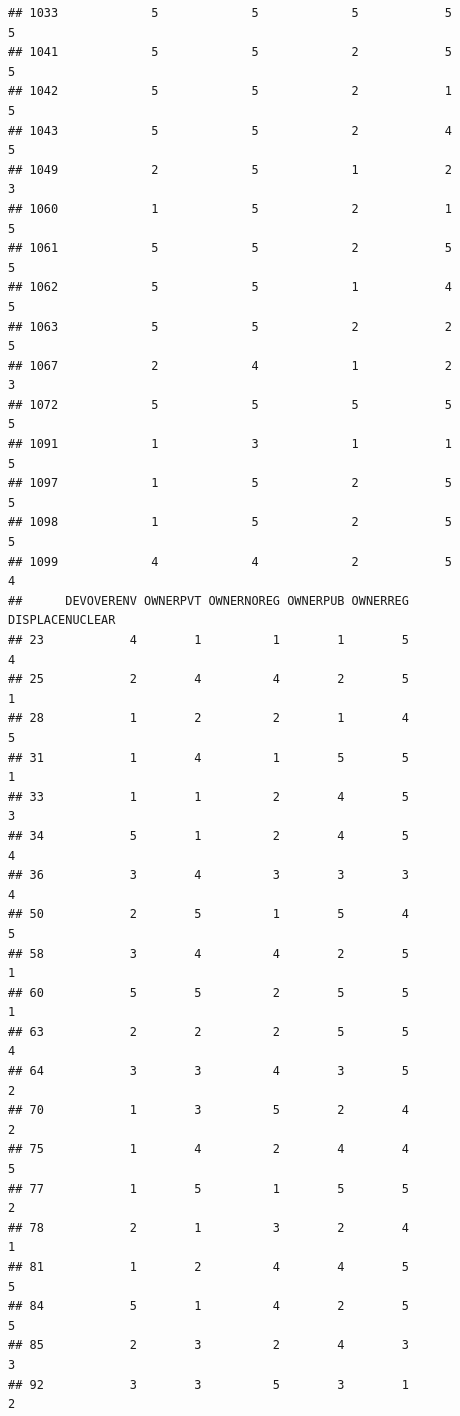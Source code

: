\documentclass[
]{article}
\begin{document}
\begin{verbatim}
## 1033             5             5             5            5          5
## 1041             5             5             2            5          5
## 1042             5             5             2            1          5
## 1043             5             5             2            4          5
## 1049             2             5             1            2          3
## 1060             1             5             2            1          5
## 1061             5             5             2            5          5
## 1062             5             5             1            4          5
## 1063             5             5             2            2          5
## 1067             2             4             1            2          3
## 1072             5             5             5            5          5
## 1091             1             3             1            1          5
## 1097             1             5             2            5          5
## 1098             1             5             2            5          5
## 1099             4             4             2            5          4
##      DEVOVERENV OWNERPVT OWNERNOREG OWNERPUB OWNERREG DISPLACENUCLEAR
## 23            4        1          1        1        5               4
## 25            2        4          4        2        5               1
## 28            1        2          2        1        4               5
## 31            1        4          1        5        5               1
## 33            1        1          2        4        5               3
## 34            5        1          2        4        5               4
## 36            3        4          3        3        3               4
## 50            2        5          1        5        4               5
## 58            3        4          4        2        5               1
## 60            5        5          2        5        5               1
## 63            2        2          2        5        5               4
## 64            3        3          4        3        5               2
## 70            1        3          5        2        4               2
## 75            1        4          2        4        4               5
## 77            1        5          1        5        5               2
## 78            2        1          3        2        4               1
## 81            1        2          4        4        5               5
## 84            5        1          4        2        5               5
## 85            2        3          2        4        3               3
## 92            3        3          5        3        1               2

\end{verbatim}
\end{document}
